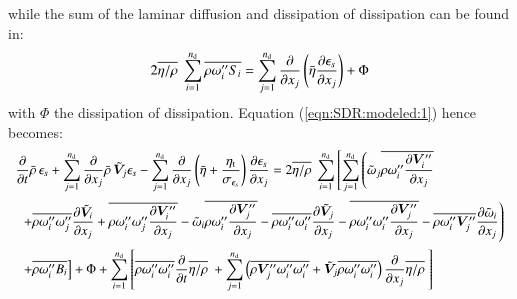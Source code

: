 \documentclass{warpdoc}
\newcommand{\alb}{\vspace{0.2cm}\\} %
\newcommand{\nd}{{{n}_{\rm d}}}
\newcommand{\turb}{_{\rm t}}
\newcommand{\etat}{{\eta\turb}}
\newcommand{\mfd}{\displaystyle}
\begin{document}
%
while the sum of the laminar diffusion and dissipation of dissipation can be found in:
%
\begin{equation}
 2 \overline{\eta/\rho}~ \sum_{i=1}^\nd \overline{\rho \omega_i^{{\prime\prime}} S_i}
  = \sum_{j=1}^\nd \frac{\partial }{\partial x_j} \left( \wbar{\eta} \frac{\partial \epsilon_s}{\partial x_j}\right) + \Phi
\end{equation}
%
with $\Phi$ the dissipation of dissipation. Equation (\ref{eqn:SDR:modeled:1}) hence becomes:
%
\begin{equation}
 \begin{array}{l}
         \mfd \frac{\partial }{\partial t} \wbar{\rho}\, \epsilon_s
        +\mfd\sum_{j=1}^{\nd}
           \frac{\partial }{\partial x_j} \wbar{\rho}\, {\wtilde{\bm{V}}_j} \epsilon_s
        -\sum_{j=1}^\nd \frac{\partial }{\partial x_j} \left( \wbar{\eta} +\frac{\etat}{\sigma_{\epsilon_s}} \right)\frac{\partial \epsilon_s}{\partial x_j}
 = 
   2 \overline{\eta/\rho}~ \mfd\sum_{i=1}^{\nd} \left[ \mfd\sum_{j=1}^{\nd}
    \mfd\left(
         {\wtilde{\omega}_j} \overline{\rho  \omega_i^{{\prime\prime}}  \frac{\partial \bm{V}_i^{{\prime\prime}}}{\partial x_j}}
    \right. \right.\alb~~
    \mfd\left.
             + \overline{\rho  \omega_i^{{\prime\prime}}  \omega_j^{{\prime\prime}}} \frac{\partial {\wtilde{\bm{V}}_i}}{\partial x_j}
             + \overline{\rho  \omega_i^{{\prime\prime}}  \omega_j^{{\prime\prime}} \frac{\partial \bm{V}_i^{{\prime\prime}}}{\partial x_j}}
       - {\wtilde{\omega}_i} \overline{\rho  \omega_i^{{\prime\prime}}  \frac{\partial \bm{V}_j^{{\prime\prime}}}{\partial x_j}}
             - \overline{\rho  \omega_i^{{\prime\prime}}  \omega_i^{{\prime\prime}}} \frac{\partial {\wtilde{\bm{V}}_j}}{\partial x_j}
             - \overline{\rho  \omega_i^{{\prime\prime}}  \omega_i^{{\prime\prime}} \frac{\partial \bm{V}_j^{{\prime\prime}}}{\partial x_j}} - \overline{\rho \omega_i^{{\prime\prime}} \bm{V}_j^{{\prime\prime}}}  \frac{\partial {\wtilde{\omega}_i}}{\partial x_j}
    \right)\alb~~
    \mfd\left.
       + \overline{\rho \omega_i^{{\prime\prime}} B_i}
    \right] + \Phi
   \mfd + \sum_{i=1}^\nd  \left[
     \overline{\rho \omega_i^{{\prime\prime}} \omega_i^{{\prime\prime}}}\frac{\partial }{\partial t} \overline{\eta/\rho}~
      + \sum_{j=1}^\nd \left(
       \overline{\rho \bm{V}_j^{{\prime\prime}} \omega_i^{{\prime\prime}} \omega_i^{{\prime\prime}}}+{\wtilde{\bm{V}}_j} \overline{\rho \omega_i^{{\prime\prime}} \omega_i^{{\prime\prime}}}
     \right)\frac{\partial}{\partial x_j}\overline{\eta/\rho}~
   \right]
 \end{array}
\label{eqn:SDR:modeled:2}
\end{equation}
%
\end{document}
